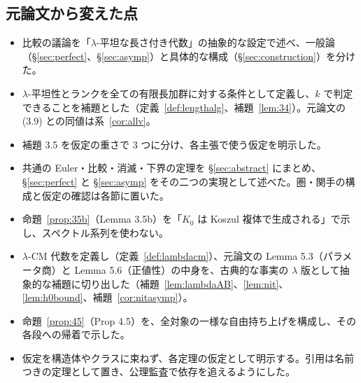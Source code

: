 \documentclass[11pt,a4paper]{ltjsarticle}
\numberwithin{equation}{section}
\theoremstyle{plain}
\theoremstyle{definition}
\theoremstyle{definition}
\begin{document}
\subsection{元論文から変えた点}
\begin{itemize}
  \item 比較の議論を「$\lambda$-平坦な長さ付き代数」の抽象的な設定で述べ、一般論（§\ref{sec:perfect}、§\ref{sec:asymp}）と具体的な構成（§\ref{sec:construction}）を分けた。
  \item $\lambda$-平坦性とランクを全ての有限長加群に対する条件として定義し、$k$ で判定できることを補題とした（定義~\ref{def:lengthalg}、補題~\ref{lem:34}）。元論文の (3.9) との同値は系~\ref{cor:allv}。
  \item 補題 3.5 を仮定の重さで 3 つに分け、各主張で使う仮定を明示した。
  \item 共通の Euler・比較・消滅・下界の定理を §\ref{sec:abstract} にまとめ、§\ref{sec:perfect} と §\ref{sec:asymp} をその二つの実現として述べた。圏・関手の構成と仮定の確認は各節に置いた。
  \item 命題~\ref{prop:35b}（Lemma 3.5b）を「$K_0$ は Koszul 複体で生成される」で示し、スペクトル系列を使わない。
  \item $\lambda$-CM 代数を定義し（定義~\ref{def:lambdacm}）、元論文の Lemma 5.3（パラメータ商）と Lemma 5.6（正値性）の中身を、古典的な事実の $\lambda$ 版として抽象的な補題に切り出した（補題~\ref{lem:lambdaAB}、\ref{lem:nit}、\ref{lem:h0bound}、補題~\ref{cor:nitasymp}）。
  \item 命題~\ref{prop:45}（Prop 4.5）を、全対象の一様な自由持ち上げを構成し、その各段への帰着で示した。
  \item 仮定を構造体やクラスに束ねず、各定理の仮定として明示する。引用は名前つきの定理として置き、公理監査で依存を追えるようにした。
\end{itemize}
\end{document}
